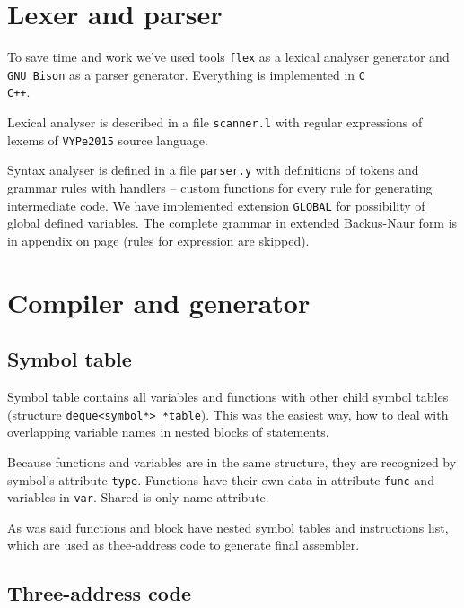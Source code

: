 \documentclass[a4paper, 11pt, titlepage, final]{article}
\begin{document}
\section{Lexer and parser}

To save time and work we've used tools \texttt{flex} as a lexical analyser generator and \texttt{GNU Bison} as a parser generator. Everything is implemented in \texttt{C\\C++}.

Lexical analyser is described in a file \texttt{scanner.l} with regular expressions of lexems of \texttt{VYPe2015} source language.

Syntax analyser is defined in a file \texttt{parser.y} with definitions of tokens and grammar rules with handlers -- custom functions for every rule for generating intermediate code. We have implemented extension \texttt{GLOBAL} for possibility of global defined variables. The complete grammar in extended Backus-Naur form is in appendix on page \pageref{grammar} (rules for expression are skipped).

\section{Compiler and generator}

\subsection{Symbol table}

Symbol table contains all variables and functions with other child symbol tables (structure \texttt{deque<symbol*> *table}). This was the easiest way, how to deal with overlapping variable names in nested blocks of statements.

Because functions and variables are in the same structure, they are recognized by symbol's attribute \texttt{type}. Functions have their own data in attribute \texttt{func} and variables in \texttt{var}. Shared is only name attribute.

As was said functions and block have nested symbol tables and instructions list, which are used as thee-address code to generate final assembler.

\subsection{Three-address code}
\end{document}
